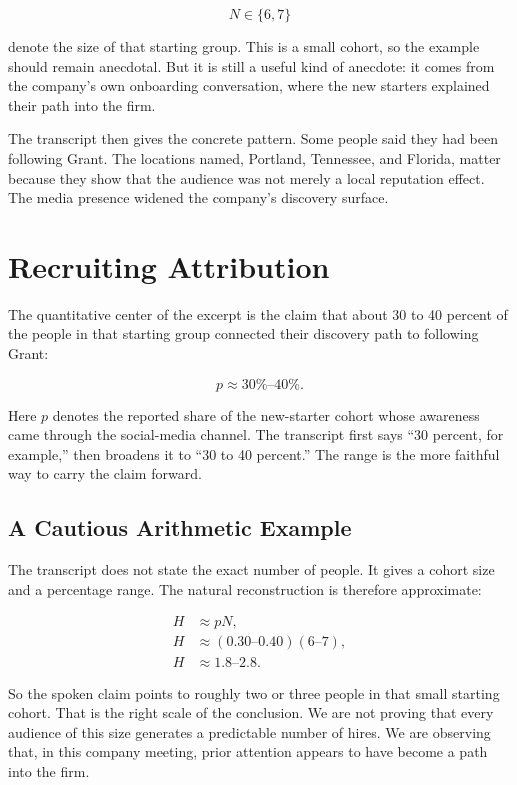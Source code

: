 \begin{equation}
N \in \{6,7\}
\end{equation}

denote the size of that starting group. This is a small cohort, so the example should remain anecdotal. But it is still a useful kind of anecdote: it comes from the company's own onboarding conversation, where the new starters explained their path into the firm.

The transcript then gives the concrete pattern. Some people said they had been following Grant. The locations named, Portland, Tennessee, and Florida, matter because they show that the audience was not merely a local reputation effect. The media presence widened the company's discovery surface.

\section{Recruiting Attribution}

The quantitative center of the excerpt is the claim that about 30 to 40 percent of the people in that starting group connected their discovery path to following Grant:

\begin{equation}
p \approx 30\%\text{--}40\%.
\end{equation}

Here \(p\) denotes the reported share of the new-starter cohort whose awareness came through the social-media channel. The transcript first says ``30 percent, for example,'' then broadens it to ``30 to 40 percent.'' The range is the more faithful way to carry the claim forward.

\subsection{A Cautious Arithmetic Example}

The transcript does not state the exact number of people. It gives a cohort size and a percentage range. The natural reconstruction is therefore approximate:

\begin{align}
H &\approx pN,\\
H &\approx (0.30\text{--}0.40)(6\text{--}7),\\
H &\approx 1.8\text{--}2.8.
\end{align}

So the spoken claim points to roughly two or three people in that small starting cohort. That is the right scale of the conclusion. We are not proving that every audience of this size generates a predictable number of hires. We are observing that, in this company meeting, prior attention appears to have become a path into the firm.

